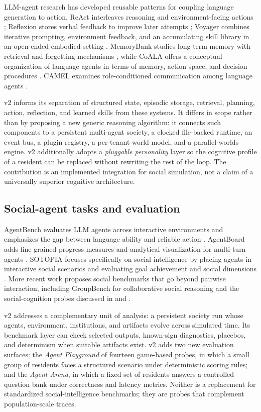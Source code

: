 LLM-agent research has developed reusable patterns for coupling language
generation to action.  ReAct interleaves reasoning and environment-facing
actions \citep{yao2023react}; Reflexion stores verbal feedback to improve
later attempts \citep{shinn2023reflexion}; Voyager combines iterative
prompting, environment feedback, and an accumulating skill library in an
open-ended embodied setting \citep{wang2023voyager}.  MemoryBank studies
long-term memory with retrieval and forgetting mechanisms
\citep{zhong2024memorybank}, while CoALA offers a conceptual organization of
language agents in terms of memory, action space, and decision procedures
\citep{sumers2024coala}.  CAMEL examines role-conditioned communication
among language agents \citep{li2023camel}.

v2 informs its separation of structured state, episodic storage, retrieval,
planning, action, reflection, and learned skills from these systems.  It
differs in scope rather than by proposing a new generic reasoning algorithm:
it connects such components to a persistent multi-agent society, a clocked
file-backed runtime, an event bus, a plugin registry, a per-tenant world
model, and a parallel-worlds engine.  v2 additionally adopts a
\emph{pluggable personality} layer so the cognitive profile of a resident can
be replaced without rewriting the rest of the loop.  The contribution is an
implemented integration for social simulation, not a claim of a universally
superior cognitive architecture.

\subsection{Social-agent tasks and evaluation}

AgentBench evaluates LLM agents across interactive environments and emphasizes
the gap between language ability and reliable action
\citep{liu2024agentbench}.  AgentBoard adds fine-grained progress measures
and analytical visualization for multi-turn agents \citep{ma2024agentboard}.
SOTOPIA focuses specifically on social intelligence by placing agents in
interactive social scenarios and evaluating goal achievement and social
dimensions \citep{zhou2024sotopia}.  More recent work proposes social
benchmarks that go beyond pairwise interaction, including GroupBench for
collaborative social reasoning and the social-cognition probes discussed in
\citet{hashimoto2022generate} and \citet{leng2024llm}.

v2 addresses a complementary unit of analysis: a persistent society run
whose agents, environment, institutions, and artifacts evolve across
simulated time.  Its benchmark layer can check selected outputs, known-sign
diagnostics, placebos, and determinism when suitable artifacts exist.  v2
adds two new evaluation surfaces: the \emph{Agent Playground} of fourteen
game-based probes, in which a small group of residents faces a structured
scenario under deterministic scoring rules; and the \emph{Agent Arena}, in
which a fixed set of residents answers a controlled question bank under
correctness and latency metrics.  Neither is a replacement for
standardized social-intelligence benchmarks; they are probes that
complement population-scale traces.

